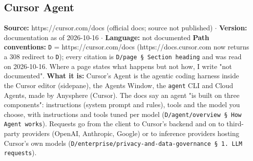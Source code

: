 \subsection{Cursor Agent}

\textbf{Source:} https://cursor.com/docs (official docs; source not published) $\cdot$ \textbf{Version:} documentation as of 2026-10-16 $\cdot$ \textbf{Language:} not documented
\textbf{Path conventions:} \texttt{D} = https://cursor.com/docs (https://docs.cursor.com now returns a 308 redirect to \texttt{D}); every citation is \texttt{D/\allowbreak{}page § Section heading} and was read on 2026-10-16. Where a page states what happens but not how, I write "not documented".
\textbf{What it is:} Cursor's Agent is the agentic coding harness inside the Cursor editor (sidepane), the Agents Window, the \texttt{agent} CLI and Cloud Agents, made by Anysphere (Cursor). The docs say an agent "is built on three components": instructions (system prompt and rules), tools and the model you choose, with instructions and tools tuned per model (\texttt{D/\allowbreak{}agent/\allowbreak{}overview § How Agent works}). Requests go from the client to Cursor's backend and on to third-party providers (OpenAI, Anthropic, Google) or to inference providers hosting Cursor's own models (\texttt{D/\allowbreak{}enterprise/\allowbreak{}privacy-\allowbreak{}and-\allowbreak{}data-\allowbreak{}governance § 1.\allowbreak{} LLM requests}).

